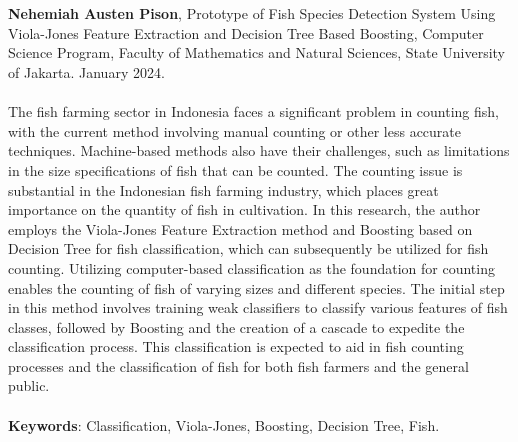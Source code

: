 \chapter*{}
\singlespacing{}

\textbf{Nehemiah Austen Pison}, Prototype of Fish Species Detection System 
Using Viola-Jones Feature Extraction and Decision Tree Based Boosting, Computer Science Program, Faculty of 
Mathematics and Natural Sciences, State University of Jakarta. January 2024.
\\
\\

The fish farming sector in Indonesia faces a significant problem in counting fish, 
with the current method involving manual counting or other less accurate techniques. 
Machine-based methods also have their challenges, such as limitations in the size 
specifications of fish that can be counted. The counting issue is substantial in 
the Indonesian fish farming industry, which places great importance on the quantity 
of fish in cultivation. In this research, the author employs the Viola-Jones 
Feature Extraction method and Boosting based on Decision Tree for fish 
classification, which can subsequently be utilized for fish counting. 
Utilizing computer-based classification as the foundation for counting 
enables the counting of fish of varying sizes and different species. The initial step 
in this method involves training weak classifiers to classify various features of 
fish classes, followed by Boosting and the creation of a cascade to expedite the 
classification process. This classification is expected to aid in fish counting 
processes and the classification of fish for both fish farmers and the general public.
\\
\\
\textbf{Keywords}: Classification, Viola-Jones, Boosting, Decision Tree, Fish.